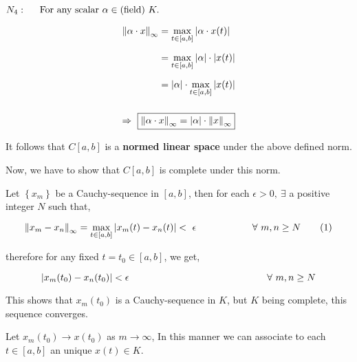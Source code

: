\documentclass[a4paper,12pt]{article}
\begin{document}
    \begin{center}
        $N_4:\hspace*{0.5cm}  \mbox{For any scalar}\  \alpha \in \mbox{(field)}\  K.$
    \end{center}

    \begin{equation*}
        \begin{split}
            \norm{\alpha \cdot x}_{\infty} & = \displaystyle \max_{t \in [a,b]} |\alpha \cdot x(t)|\\[2mm]
            & =   \displaystyle \max_{t \in [a,b]} |\alpha| \cdot |x(t)|\\[2mm]
            & = |\alpha| \cdot \displaystyle \max_{t \in [a,b]} |x(t)|\\[2mm]
        \end{split}
    \end{equation*}

    \[\Rightarrow\  \boxed{\norm{\alpha \cdot x}_{\infty}  = |\alpha| \cdot \norm{x}_{\infty}}\]
    \vspace*{0.3cm}

    It follows that $C[a,b]$ is a {\bf normed linear space} under the above defined norm.

    \vspace*{0.4cm}

    Now, we have to show that $C[a,b]$ is complete under this norm.

    Let $\left\{x_m\right\}$ be a Cauchy-sequence in $[a,b]$, then for each $\epsilon > 0,\ \exists$ a positive integer $N$ such that,
    
    \begin{equation*}
        \norm{x_m - x_n}_{\infty} = \displaystyle \max_{t \in [a,b]} |x_m (t) - x_n (t)| <\  \epsilon\, \hspace*{2cm} \forall\ m,n \geq N  \tag*{(1)}
    \end{equation*}

    therefore for any fixed $t = t_0 \in [a,b]$, we get,
    
    \[|x_m(t_0) - x_n(t_0)| < \epsilon\, \hspace*{5cm} \forall\ m,n \geq N \]

    This shows that $x_m(t_0)$ is a Cauchy-sequence in $K$, but $K$ being complete, this sequence converges.

    \pagebreak

    \vspace*{0.5cm}

    Let $x_m(t_0)\to x(t_0)$ as $m\to \infty$, In this manner we can associate to each $t\in [a,b]$ an unique $x(t)\in K$.
\end{document}
